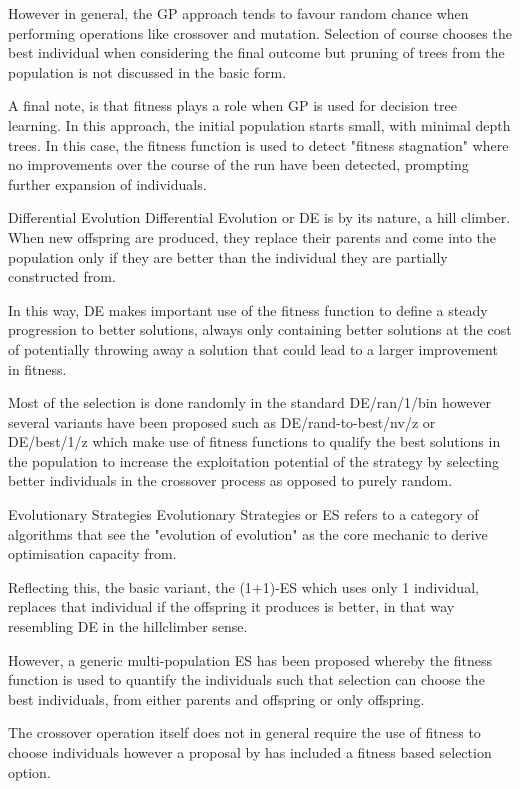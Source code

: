 \documentclass[12pt]{article}
\begin{document}
However in general, the GP approach tends to favour random chance when performing operations like crossover and mutation. Selection of course chooses the best individual when considering the final outcome but pruning of trees from the population is not discussed in the basic form.

A final note, is that fitness plays a role when GP is used for decision tree learning. In this approach, the initial population starts small, with minimal depth trees. In this case, the fitness function is used to detect "fitness stagnation" where no improvements over the course of the run have been detected, prompting further expansion of individuals.


Differential Evolution
Differential Evolution or DE is by its nature, a hill climber. When new offspring are produced, they replace their parents and come into the population only if they are better than the individual they are partially constructed from.

In this way, DE makes important use of the fitness function to define a steady progression to better solutions, always only containing better solutions at the cost of potentially throwing away a solution that could lead to a larger improvement in fitness.

Most of the selection is done randomly in the standard DE/ran/1/bin however several variants have been proposed such as DE/rand-to-best/nv/z or DE/best/1/z which make use of fitness functions to qualify the best solutions in the population to increase the exploitation potential of the strategy by selecting better individuals in the crossover process as opposed to purely random. 

Evolutionary Strategies
Evolutionary Strategies or ES refers to a category of algorithms that see the "evolution of evolution" as the core mechanic to derive optimisation capacity from.

Reflecting this, the basic variant, the (1+1)-ES which uses only 1 individual, replaces that individual if the offspring it produces is better, in that way resembling DE in the hillclimber sense.

However, a generic multi-population ES has been proposed whereby the fitness function is used to quantify the individuals such that selection can choose the best individuals, from either parents and offspring or only offspring.

The crossover operation itself does not in general require the use of fitness to choose individuals however a proposal by \cite{izumi_hashem_watanabe_1997} has included a fitness based selection option.
\end{document}
